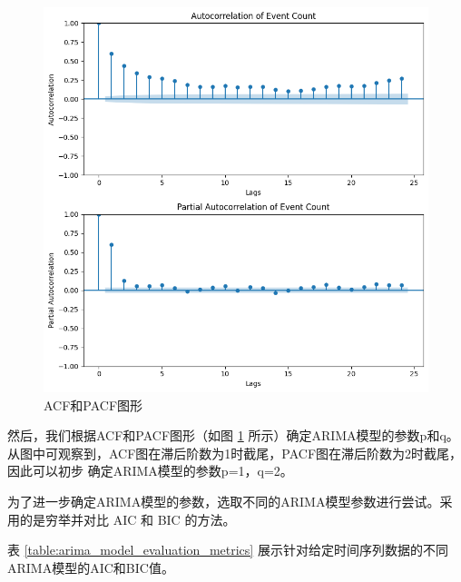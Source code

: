 \documentclass[a4paper,AutoFakeBold,oneside,12pt]{book}
\begin{document}
\begin{figure}[htbp]
	\centering
	\includegraphics[width=1.0\textwidth]{images/acf-pacf.png}
	\caption{ACF和PACF图形}
	\label{fig:arima-acf-pacf}
  \end{figure}

然后，我们根据ACF和PACF图形（如图 \ref{fig:arima-acf-pacf} 所示）确定ARIMA模型的参数p和q。
从图中可观察到，ACF图在滞后阶数为1时截尾，PACF图在滞后阶数为2时截尾，因此可以初步
确定ARIMA模型的参数p=1，q=2。

为了进一步确定ARIMA模型的参数，选取不同的ARIMA模型参数进行尝试。采用的是穷举并对比 AIC 和 BIC
的方法。

表 \ref{table:arima_model_evaluation_metrics} 展示针对给定时间序列数据的不同ARIMA模型的AIC和BIC值。
\end{document}
